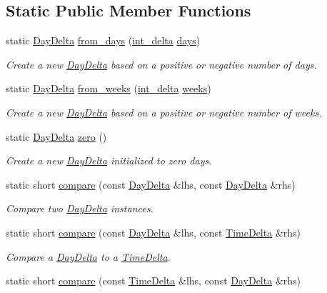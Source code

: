 \subsection*{Static Public Member Functions}
\begin{DoxyCompactItemize}
\item 
static \hyperlink{structDayDelta}{Day\-Delta} \hyperlink{structDayDelta_a7421a2d8448dd7d5329d72d0d6a04cbd}{from\-\_\-days} (\hyperlink{types_8h_a8a67cf99971c5cfeeaa2380ba84a4c92}{int\-\_\-delta} \hyperlink{structDayDelta_af7d15328d1c97bbd3316f014c69a6e3b}{days})
\begin{DoxyCompactList}\small\item\em Create a new \hyperlink{structDayDelta}{Day\-Delta} based on a positive or negative number of days. \end{DoxyCompactList}\item 
static \hyperlink{structDayDelta}{Day\-Delta} \hyperlink{structDayDelta_a871bbf34275016d74c7ef8c8777c3258}{from\-\_\-weeks} (\hyperlink{types_8h_a8a67cf99971c5cfeeaa2380ba84a4c92}{int\-\_\-delta} \hyperlink{structDayDelta_a48287489831fa9ec472451487908e663}{weeks})
\begin{DoxyCompactList}\small\item\em Create a new \hyperlink{structDayDelta}{Day\-Delta} based on a positive or negative number of weeks. \end{DoxyCompactList}\item 
static \hyperlink{structDayDelta}{Day\-Delta} \hyperlink{structDayDelta_acfcc09473305041a930a1ea6a3c20409}{zero} ()
\begin{DoxyCompactList}\small\item\em Create a new \hyperlink{structDayDelta}{Day\-Delta} initialized to zero days. \end{DoxyCompactList}\item 
static short \hyperlink{structDayDelta_af8a4d86216517f70136406b08b54357c}{compare} (const \hyperlink{structDayDelta}{Day\-Delta} \&lhs, const \hyperlink{structDayDelta}{Day\-Delta} \&rhs)
\begin{DoxyCompactList}\small\item\em Compare two \hyperlink{structDayDelta}{Day\-Delta} instances. \end{DoxyCompactList}\item 
static short \hyperlink{structDayDelta_a29afd5af43e3efe57b00784e77ccf67f}{compare} (const \hyperlink{structDayDelta}{Day\-Delta} \&lhs, const \hyperlink{structTimeDelta}{Time\-Delta} \&rhs)
\begin{DoxyCompactList}\small\item\em Compare a \hyperlink{structDayDelta}{Day\-Delta} to a \hyperlink{structTimeDelta}{Time\-Delta}. \end{DoxyCompactList}\item 
static short \hyperlink{structDayDelta_abac87320f446ebf1e6b73bb1c36150cc}{compare} (const \hyperlink{structTimeDelta}{Time\-Delta} \&lhs, const \hyperlink{structDayDelta}{Day\-Delta} \&rhs)
\end{DoxyCompactItemize}
